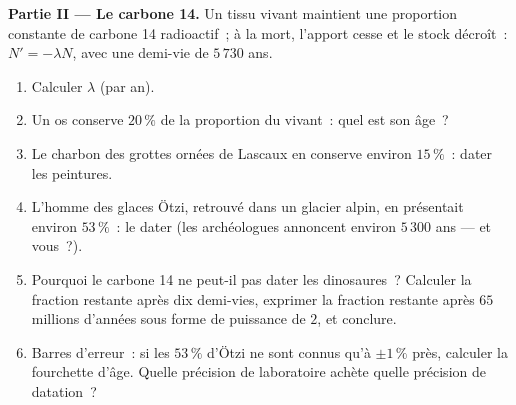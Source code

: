 \begin{problem}
\medskip
\noindent\textbf{Partie II --- Le carbone 14.}
Un tissu vivant maintient une proportion constante de carbone 14
radioactif~; à la mort, l'apport cesse et le stock décroît~:
$N' = -\lambda N$, avec une demi-vie de $5\,730$ ans.
\begin{enumerate}[resume]
  \item Calculer $\lambda$ (par an).
  \item Un os conserve $20\,\%$ de la proportion du vivant~: quel
        est son âge~?
  \item Le charbon des grottes ornées de Lascaux en conserve environ
        $15\,\%$~: dater les peintures.
  \item L'homme des glaces Ötzi, retrouvé dans un glacier alpin,
        en présentait environ $53\,\%$~: le dater (les archéologues
        annoncent environ $5\,300$ ans --- et vous~?).
  \item Pourquoi le carbone 14 ne peut-il pas dater les
        dinosaures~? Calculer la fraction restante après dix
        demi-vies, exprimer la fraction restante après $65$ millions
        d'années sous forme de puissance de $2$, et conclure.
  \item Barres d'erreur~: si les $53\,\%$ d'Ötzi ne sont connus
        qu'à $\pm 1\,\%$ près, calculer la fourchette d'âge. Quelle
        précision de laboratoire achète quelle précision de
        datation~?
\end{enumerate}


\end{problem}
